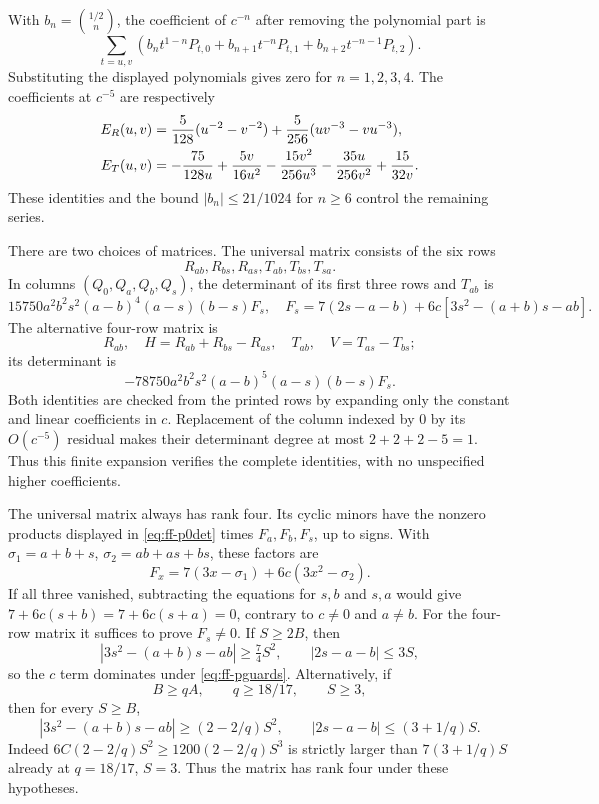 \documentclass[12pt]{article}
\numberwithin{equation}{section}
\begin{document}
With $b_n=\binom{1/2}{n}$, the coefficient of $c^{-n}$ after removing
the polynomial part is
\begin{equation}\label{eq:ff-pcancel}
 \sum_{t=u,v}\left(b_nt^{1-n}P_{t,0}
       +b_{n+1}t^{-n}P_{t,1}+b_{n+2}t^{-n-1}P_{t,2}\right).
\end{equation}
Substituting the displayed polynomials gives zero for $n=1,2,3,4$.
The coefficients at $c^{-5}$ are respectively
\begin{align}
 E_R(u,v)&=\frac5{128}(u^{-2}-v^{-2})
              +\frac5{256}(uv^{-3}-vu^{-3}),\label{eq:ff-leading}\\
 E_T(u,v)&=-\frac{75}{128u}+\frac{5v}{16u^2}
 -\frac{15v^2}{256u^3}-\frac{35u}{256v^2}+\frac{15}{32v}.\notag
\end{align}
These identities and the bound $|b_n|\le21/1024$ for $n\ge6$ control the remaining series.

There are two choices of matrices. The universal matrix consists of
the six rows
\begin{equation}\label{eq:ff-p0rows}
 R_{ab},R_{bs},R_{as},T_{ab},T_{bs},T_{sa}.
\end{equation}
In columns $(Q_0,Q_a,Q_b,Q_s)$, the determinant of its first three
rows and $T_{ab}$ is
\begin{equation}\label{eq:ff-p0det}
 15750a^2b^2s^2(a-b)^4(a-s)(b-s)F_s,
 \quad F_s=7(2s-a-b)+6c[3s^2-(a+b)s-ab].
\end{equation}
The alternative four-row matrix is
\begin{equation}\label{eq:ff-prows}
 R_{ab},\quad H=R_{ab}+R_{bs}-R_{as},\quad
 T_{ab},\quad V=T_{as}-T_{bs};
\end{equation}
its determinant is
\begin{equation}\label{eq:ff-pdet}
 -78750a^2b^2s^2(a-b)^5(a-s)(b-s)F_s.
\end{equation}
Both identities are checked from the printed rows by expanding only
the constant and linear coefficients in $c$. Replacement of the column indexed by $0$ by its $O(c^{-5})$ residual makes their determinant degree at
most $2+2+2-5=1$. Thus this finite expansion verifies the complete
identities, with no unspecified higher coefficients.

The universal matrix always has rank four. Its cyclic minors have
the nonzero products displayed in \eqref{eq:ff-p0det}
times $F_a,F_b,F_s$, up to signs. With
$\sigma_1=a+b+s$, $\sigma_2=ab+as+bs$, these factors are
\[
 F_x=7(3x-\sigma_1)+6c(3x^2-\sigma_2).
\]
If all three vanished, subtracting the equations for $s,b$ and $s,a$
would give $7+6c(s+b)=7+6c(s+a)=0$, contrary to $c\ne0$ and $a\ne b$.
For the four-row matrix it suffices to prove $F_s\ne0$.
If $S\ge2B$, then
\[
 |3s^2-(a+b)s-ab|\ge\tfrac74S^2,\qquad |2s-a-b|\le3S,
\]
so the $c$ term dominates under \eqref{eq:ff-pguards}.
Alternatively, if
\begin{equation}\label{eq:ff-allSrank}
 B\ge qA,\qquad q\ge18/17,\qquad S\ge3,
\end{equation}
then for every $S\ge B$,
\[
 |3s^2-(a+b)s-ab|\ge(2-2/q)S^2,
 \qquad |2s-a-b|\le(3+1/q)S.
\]
Indeed $6C(2-2/q)S^2\ge1200(2-2/q)S^3$
is strictly larger than $7(3+1/q)S$ already at $q=18/17$, $S=3$.
Thus the matrix has rank four under these hypotheses.
\end{document}
